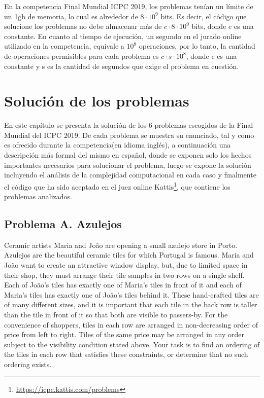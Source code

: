 \documentclass{report}
\begin{document}
En la competencia Final Mundial ICPC 2019, los problemas ten\'ian un l\'imite de un 1gb de
memoria, lo cual es alrededor de $8 \cdot 10^9$ bits. Es decir, el c\'odigo que solucione los problemas no
debe almacenar m\'as de $c \cdot 8 \cdot 10^9$ bits, donde c es una constante.
En cuanto al tiempo de ejecuci\'on, un segundo en el jurado online utilizado en la competencia,
equivale a $10^8$ operaciones, por lo tanto, la cantidad de operaciones permisibles para cada
problema es $c \cdot s \cdot 10^8$, donde c es una constante y s es la cantidad de segundos que exige el
problema en cuesti\'on.

\chapter{Soluci\'on de los problemas}
\label{chap:Solucion}
En este cap\'itulo se presenta la soluci\'on de los 6 problemas escogidos de la Final Mundial
del ICPC 2019. De cada problema se muestra su enunciado, tal y como es ofrecido durante la
competencia(en idioma ingl\'es), a continuaci\'on una descripci\'on m\'as formal del mismo en espa\~nol,
donde se  	exponen solo los hechos importantes necesarios para solucionar el problema, luego se
expone la soluci\'on incluyendo el an\'alisis de la complejidad computacional\cite{Knuth}\cite{Complejidad1}\cite{Complejidad2} en cada caso y finalmente el c\'odigo que ha sido aceptado en el juez online Kattis\footnote{\hyperlink{Kattis}{https://icpc.kattis.com/problems}}, que
contiene los problemas analizados.

\section{Problema A. Azulejos}
Ceramic artists Maria and Jo\~ao are opening a small azulejo store in Porto. Azulejos are the beautiful ceramic tiles for which Portugal is famous. Maria and Jo\~ao
want to create an attractive window display, but, due to limited space in their
shop, they must arrange their tile samples in two rows on a single shelf. Each of
Jo\~ao's tiles has exactly one of Maria's tiles in front of it and each of Maria's tiles
has exactly one of Jo\~ao's tiles behind it. These hand-crafted tiles are of many
different sizes, and it is important that each tile in the back row is taller than the
tile in front of it so that both are visible to passers-by. For the convenience of
shoppers, tiles in each row are arranged in non-decreasing order of price from
left to right. Tiles of the same price may be arranged in any order subject to the
visibility condition stated above.
Your task is to find an ordering of the tiles in each row that satisfies these constraints, or determine that
no such ordering exists.\\
\end{document}
